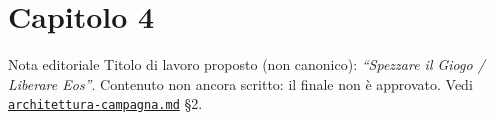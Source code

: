 \chapter*{Capitolo 4}
\label{chap:capitolo4}

\begin{DndComment}[]{Nota editoriale}
  Titolo di lavoro proposto (non canonico): \textit{``Spezzare il Giogo / Liberare Eos''}. Contenuto non ancora scritto: il finale non è approvato. Vedi \href{https://github.com/fpetrulio/child-of-balance/blob/main/docs/01-campaign-design/architettura-campagna.md}{\texttt{architettura-campagna.md}} §2.
\end{DndComment}
